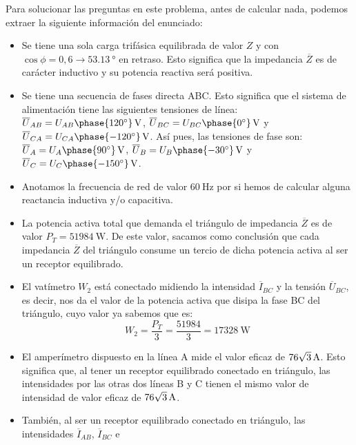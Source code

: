 Para solucionar las preguntas en este problema, antes de calcular
nada, podemos extraer la siguiente información del enunciado:
\begin{itemize} %
\item Se tiene una sola carga trifásica equilibrada de valor $Z$ y con
  $\cos{\phi}=0,6\rightarrow \qty{53.13}{\degree}$ en retraso. Esto
  significa que la impedancia $\overline{Z}$ es de carácter inductivo
  y su potencia reactiva será positiva.
\item Se tiene una secuencia de fases directa ABC. Esto significa que
  el sistema de alimentación tiene las siguientes tensiones de línea:
  $\overline{U}_{AB}=\qty[parse-numbers=false]{U_{AB}\phase{\ang{120}}}{\volt}$,
  $\overline{U}_{BC}=\qty[parse-numbers=false]{U_{BC}\phase{\ang{0}}}{\volt}$
  y
  $\overline{U}_{CA}=\qty[parse-numbers=false]{U_{CA}\phase{\ang{-120}}}{\volt}$. Así
  pues, las tensiones de fase son:
  $\overline{U}_{A}=\qty[parse-numbers=false]{U_{A}\phase{\ang{90}}}{\volt}$,
  $\overline{U}_{B}=\qty[parse-numbers=false]{U_{B}\phase{\ang{-30}}}{\volt}$
  y
  $\overline{U}_{C}=\qty[parse-numbers=false]{U_{C}\phase{\ang{-150}}}{\volt}$.
\item Anotamos la frecuencia de red de valor $\qty{60}{\hertz}$ por si
  hemos de calcular alguna reactancia inductiva y/o capacitiva.
\item La potencia activa total que demanda el triángulo de impedancia
  $\overline{Z}$ es de valor $P_T=\qty{51984}{\watt}$. De este valor,
  sacamos como conclusión que cada impedancia $\overline{Z}$ del
  triángulo consume un tercio de dicha potencia activa al ser un
  receptor equilibrado.
\item El vatímetro $W_2$ está conectado midiendo la intensidad
  $\overline{I}_{BC}$ y la tensión $\overline{U}_{BC}$, es decir, nos
  da el valor de la potencia activa que disipa la fase BC del
  triángulo, cuyo valor ya sabemos que es:
  \[
    W_2=\dfrac{P_T}{3}=\dfrac{51984}{3}=\qty{17328}{\watt}
  \]
\item El amperímetro dispuesto en la línea A mide el valor eficaz de
  $\qty[parse-numbers=false]{76\sqrt{3}}{\ampere}$. Esto significa que,
  al tener un receptor equilibrado conectado en triángulo, las
  intensidades por las otras dos líneas B y C tienen el mismo valor de
  intensidad de valor eficaz de
  $\qty[parse-numbers=false]{76\sqrt{3}}{\ampere}$.
\item También, al ser un receptor equilibrado conectado en triángulo,
  las intensidades $\overline{I}_{AB}$, $\overline{I}_{BC}$ e

\end{itemize}
